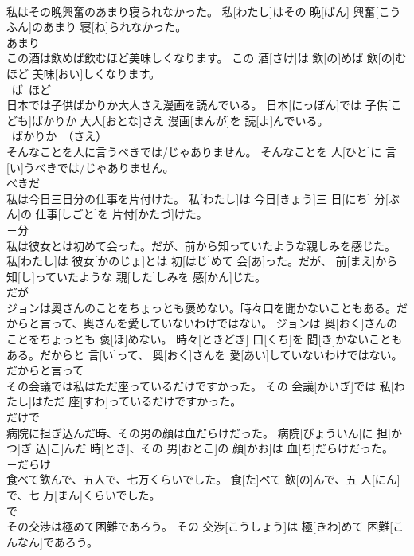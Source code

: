 \documentclass[8pt]{extreport}
\begin{document}
\begin{CJK}{UTF8}{min}
\\	私はその晩興奮のあまり寝られなかった。	私[わたし]はその 晩[ばん] 興奮[こうふん]のあまり 寝[ね]られなかった。	
\\	あまり	
\\	この酒は飲めば飲むほど美味しくなります。	この 酒[さけ]は 飲[の]めば 飲[の]むほど 美味[おい]しくなります。	
\\	~ば~ほど	
\\	日本では子供ばかりか大人さえ漫画を読んでいる。	日本[にっぽん]では 子供[こども]ばかりか 大人[おとな]さえ 漫画[まんが]を 読[よ]んでいる。	
\\	~ばかりか~（さえ）	
\\	そんなことを人に言うべき{では/じゃ}ありません。	そんなことを 人[ひと]に 言[い]うべき{では/じゃ}ありません。	
\\	べきだ	
\\	私は今日三日分の仕事を片付けた。	私[わたし]は 今日[きょう]三 日[にち] 分[ぶん]の 仕事[しごと]を 片付[かたづ]けた。	
\\	－分	
\\	私は彼女とは初めて会った。だが、前から知っていたような親しみを感じた。	私[わたし]は 彼女[かのじょ]とは 初[はじ]めて 会[あ]った。だが、 前[まえ]から 知[し]っていたような 親[した]しみを 感[かん]じた。	
\\	だが	
\\	ジョンは奥さんのことをちょっとも褒めない。時々口を聞かないこともある。だからと言って、奥さんを愛していないわけではない。	ジョンは 奥[おく]さんのことをちょっとも 褒[ほ]めない。 時々[ときどき] 口[くち]を 聞[き]かないこともある。だからと 言[い]って、 奥[おく]さんを 愛[あい]していないわけではない。	
\\	だからと言って	
\\	その会議では私はただ座っているだけですかった。	その 会議[かいぎ]では 私[わたし]はただ 座[すわ]っているだけですかった。	
\\	だけで	
\\	病院に担ぎ込んだ時、その男の顔は血だらけだった。	病院[びょういん]に 担[かつ]ぎ 込[こ]んだ 時[とき]、その 男[おとこ]の 顔[かお]は 血[ち]だらけだった。	
\\	－だらけ	
\\	食べて飲んで、五人で、七万くらいでした。	食[た]べて 飲[の]んで、五 人[にん]で、七 万[まん]くらいでした。	
\\	で	
\\	その交渉は極めて困難であろう。	その 交渉[こうしょう]は 極[きわ]めて 困難[こんなん]であろう。	

\end{CJK}
\end{document}
